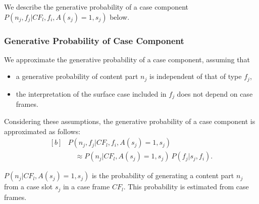 \documentclass[english]{jnlp_1.4_rep}
\begin{document}
\pagebreak
We describe the generative probability of a case component
$P(n_j,f_j|CF_l, f_i, A(s_j)=1, s_j)$ below.


\subsubsection{Generative Probability of Case Component}
\label{Section::格要素生成確率}

We approximate the generative probability of a case component, assuming that

\begin{itemize} \itemsep=0mm
 \item a generative probability of content part $n_j$ is independent of
       that of type $f_j$,
 \item the interpretation of the surface case included in $f_j$ does
		     not depend on case frames.
\end{itemize}

\noindent
Considering these assumptions, the generative probability of a
case component is approximated as follows:
\begin{equation}
\begin{aligned}[b]
 & P(n_j,f_j|CF_l, f_i, A(s_j)=1, s_j)  \\
 & \quad \approx P(n_j|CF_l, A(s_j)=1, s_j) \ P(f_j|s_j, f_i). 
\end{aligned}
\label{Prob::CaseComponent}
\end{equation}

$P(n_j|CF_l, A(s_j)=1,s_j)$ is the probability of generating a content
part $n_j$ from a case slot $s_j$ in a case frame $CF_l$.
This probability is estimated from case frames.
\end{document}
